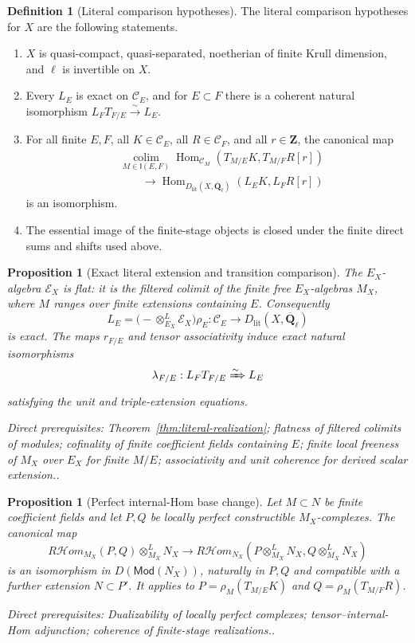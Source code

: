 \documentclass[10pt]{article}
\newtheorem{proposition}[theorem]{Proposition}
\theoremstyle{definition}
\newtheorem{definition}[theorem]{Definition}
\newcommand{\Qlb}{\overline{\mathbf Q}_\ell}
\newcommand{\Hom}{\operatorname{Hom}}
\newcommand{\depends}[1]{\par\smallskip\noindent\textit{Direct prerequisites:} #1.}
\begin{document}
\begin{definition}[Literal comparison hypotheses]\label{def:literal-hypotheses}
The literal comparison hypotheses for $X$ are the following statements.
\begin{enumerate}[label=\textup{(L\arabic*)}]
\item $X$ is quasi-compact, quasi-separated, noetherian of finite Krull
dimension, and $\ell$ is invertible on $X$.
\item Every $L_E$ is exact on $\mathcal C_E$, and for $E\subset F$ there
is a coherent natural isomorphism $L_FT_{F/E}\xrightarrow{\sim}L_E$.
\item For all finite $E,F$, all $K\in\mathcal C_E$, all
$R\in\mathcal C_F$, and all $r\in\mathbf Z$, the canonical map
\[
\begin{aligned}
 &\operatorname*{colim}_{M\in\mathsf I(E,F)}
 \Hom_{\mathcal C_M}
   (T_{M/E}K,T_{M/F}R[r])\\
 &\qquad\longrightarrow
 \Hom_{D_{\mathrm{lit}}(X,\Qlb)}(L_EK,L_FR[r])
\end{aligned}
\]
is an isomorphism.
\item The essential image of the finite-stage objects is closed under the
finite direct sums and shifts used above.
\end{enumerate}
\end{definition}

\begin{proposition}[Exact literal extension and transition comparison]
\label{prop:literal-exact}
The $E_X$-algebra $\mathcal E_X$ is flat: it is the filtered colimit of the
finite free $E_X$-algebras $M_X$, where $M$ ranges over finite extensions
containing $E$.  Consequently
\[
 L_E=\bigl(-\otimes^L_{E_X}\mathcal E_X\bigr)\rho_E:
 \mathcal C_E\longrightarrow D_{\mathrm{lit}}(X,\Qlb)
\]
is exact.  The maps $r_{F/E}$ and tensor associativity induce exact natural
isomorphisms
\[
 \lambda_{F/E}:L_FT_{F/E}\xRightarrow{\sim}L_E
\]
satisfying the unit and triple-extension equations.
\depends{Theorem~\ref{thm:literal-realization}; flatness of filtered
colimits of modules; cofinality of finite coefficient fields containing $E$; finite
local freeness of $M_X$ over $E_X$ for finite $M/E$; associativity and unit
coherence for derived scalar extension.}
\end{proposition}

\begin{proposition}[Perfect internal-Hom base change]
\label{prop:literal-internal-hom-base-change}
Let $M\subset N$ be finite coefficient fields and let $P,Q$ be locally
perfect constructible $M_X$-complexes.  The canonical map
\[
 R\mathcal Hom_{M_X}(P,Q)\otimes^L_{M_X}N_X
 \longrightarrow
 R\mathcal Hom_{N_X}
   (P\otimes^L_{M_X}N_X,Q\otimes^L_{M_X}N_X)
\]
is an isomorphism in $D(\mathsf{Mod}(N_X))$, naturally in $P,Q$ and
compatible with a further extension $N\subset P'$.  It applies to
$P=\rho_M(T_{M/E}K)$ and $Q=\rho_M(T_{M/F}R)$.
\depends{Dualizability of locally perfect complexes; tensor--internal-Hom
adjunction; coherence of finite-stage realizations.}
\end{proposition}
\end{document}
